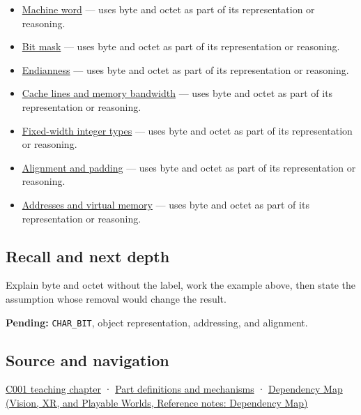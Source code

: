 \begin{itemize}
\tightlist
\item
  \hyperref[appendix-d67a19507dc5]{Machine word} --- uses byte and octet as part of its representation or reasoning.
\item
  \hyperref[appendix-dbe5905163c2]{Bit mask} --- uses byte and octet as part of its representation or reasoning.
\item
  \hyperref[appendix-bc07c3d25b18]{Endianness} --- uses byte and octet as part of its representation or reasoning.
\item
  \hyperref[appendix-e4ccdbab8320]{Cache lines and memory bandwidth} --- uses byte and octet as part of its representation or reasoning.
\item
  \hyperref[appendix-cc04044b5782]{Fixed-width integer types} --- uses byte and octet as part of its representation or reasoning.
\item
  \hyperref[appendix-a1f7c53b4742]{Alignment and padding} --- uses byte and octet as part of its representation or reasoning.
\item
  \hyperref[appendix-18ee4f913c3c]{Addresses and virtual memory} --- uses byte and octet as part of its representation or reasoning.
\end{itemize}

\subsection{Recall and next depth}\label{appendix-5bee2df85484-recall-and-next-depth}

Explain byte and octet without the label, work the example above, then state the assumption whose removal would change the result.

\textbf{Pending:} \texttt{CHAR\_BIT}, object representation, addressing, and alignment.

\subsection{Source and navigation}\label{appendix-5bee2df85484-source-and-navigation}

\hyperref[01-foundations-i-ch001-from-a-signal-to-an-interpretation]{C001 teaching chapter} · \hyperref[appendix-fd090d982a15]{Part definitions and mechanisms} · \href{../07-Vision-XR-and-Playable-Worlds/main.pdf\#nameddest=appendix-4ad47bdd269a}{Dependency Map (Vision, XR, and Playable Worlds, Reference notes: Dependency Map)}
